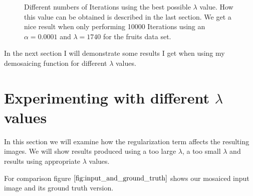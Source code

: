 \documentclass{paper}
\begin{document}
\begin{figure}[H]
\begin{center}
{   \label{fig:subfig1223}
 }
\end{center}
\caption{Different numbers of Iterations using the best possible $\lambda$ value. How this value can be obtained is described in the last section. We get a nice result when only performing 10000 Iterations using an $\alpha=0.0001$ and $\lambda = 1740$ for the fruits data set.}
\label{fig:different_iters_for_best_lambda}
\end{figure}

In the next section I will demonstrate some results I get when using my demosaicing function for different $\lambda$ values. 

\section{Experimenting with different $\lambda$ values}
In this section we will examine how the regularization term affects the resulting images. We will show results produced using a too large $\lambda$, a too small $\lambda$ and results using appropriate $\lambda$ values.

For comparison figure $\ref{fig:input_and_ground_truth}$ shows our mosaiced input image and its ground truth version.
\end{document}
